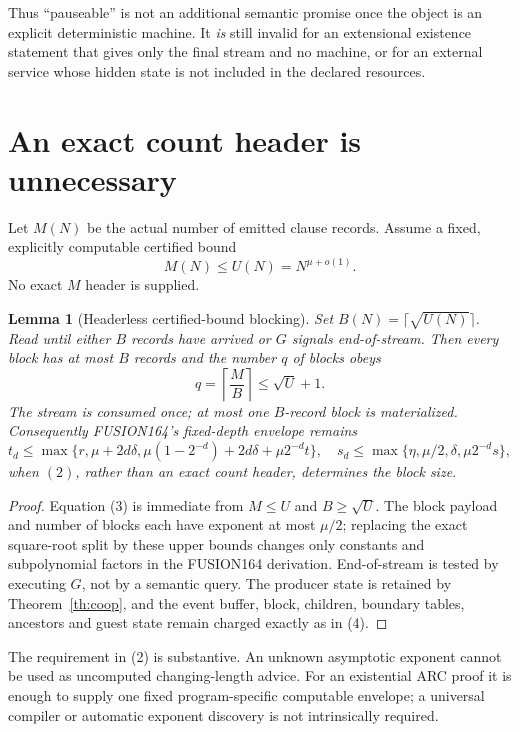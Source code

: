 \documentclass[11pt]{article}
\newtheorem{lemma}[theorem]{Lemma}
\begin{document}
Thus ``pauseable'' is not an additional semantic promise once the object is an
explicit deterministic machine.  It \emph{is} still invalid for an extensional
existence statement that gives only the final stream and no machine, or for an
external service whose hidden state is not included in the declared resources.

\section{An exact count header is unnecessary}
Let $M(N)$ be the actual number of emitted clause records.  Assume a fixed,
explicitly computable certified bound
\[
M(N)\le U(N)=N^{\mu+o(1)}.                                 \tag{2}
\]
No exact $M$ header is supplied.

\begin{lemma}[Headerless certified-bound blocking]\label{lem:header}
Set $B(N)=\lceil\sqrt{U(N)}\rceil$.  Read until either $B$ records have arrived
or $G$ signals end-of-stream.  Then every block has at most $B$ records and the
number $q$ of blocks obeys
\[
q=\left\lceil\frac{M}{B}\right\rceil\le \sqrt U+1.         \tag{3}
\]
The stream is consumed once; at most one $B$-record block is materialized.
Consequently FUSION164's fixed-depth envelope remains
\[
t_d\le\max\{r,\mu+2d\delta,
\mu(1-2^{-d})+2d\delta+\mu2^{-d}t\},
\quad
s_d\le\max\{\eta,\mu/2,\delta,\mu2^{-d}s\},               \tag{4}
\]
when $(2)$, rather than an exact count header, determines the block size.
\end{lemma}
\begin{proof}
Equation (3) is immediate from $M\le U$ and $B\ge\sqrt U$.  The block payload
and number of blocks each have exponent at most $\mu/2$; replacing the exact
square-root split by these upper bounds changes only constants and subpolynomial
factors in the FUSION164 derivation.  End-of-stream is tested by executing $G$,
not by a semantic query.  The producer state is retained by
Theorem~\ref{th:coop}, and the event buffer, block, children, boundary tables,
ancestors and guest state remain charged exactly as in (4).
\end{proof}

The requirement in (2) is substantive.  An unknown asymptotic exponent cannot
be used as uncomputed changing-length advice.  For an existential ARC proof it
is enough to supply one fixed program-specific computable envelope; a universal
compiler or automatic exponent discovery is not intrinsically required.
\end{document}
